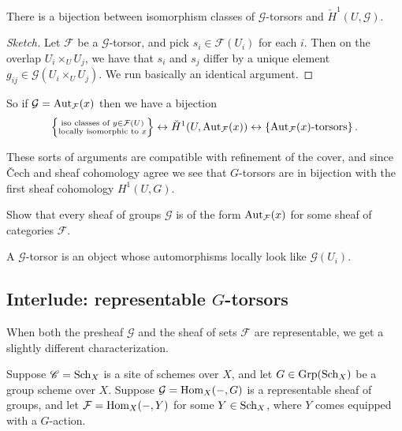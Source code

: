 \documentclass[11pt]{amsart}
\begin{document}
\begin{theorem} There is a bijection between isomorphism classes of $\mathcal{G}$-torsors and $\check{H}^1(U,\mathcal{G})$.
\end{theorem}
\begin{proof}[Sketch] Let $\mathcal{F}$ be a $\mathcal{G}$-torsor, and pick $s_i \in \mathcal{F}(U_i)$ for each $i$. Then on the overlap $U_i \times_U U_j$, we have that $s_i$ and $s_j$ differ by a unique element $g_{ij}\in \mathcal{G}(U_i \times_U U_j)$. We run basically an identical argument.
\end{proof}

So if $\mathcal{G} = \mathrm{Aut}_{\mathcal{F}}(x)$ then we have a bijection
\begin{align*}
    \left\{ \substack{\text{iso classes of }y\in \mathcal{F}(U) \\ \text{locally isomorphic to }x} \right\} \leftrightarrow \check{H}^1(U,\mathrm{Aut}_{\mathcal{F}}(x)) \leftrightarrow \left\{ \mathrm{Aut}_\mathcal{F}(x)\text{-torsors} \right\}.
\end{align*}

These sorts of arguments are compatible with refinement of the cover, and since \v{C}ech and sheaf cohomology agree we see that $G$-torsors are in bijection with the first sheaf cohomology $H^1(U,G)$.


%
\begin{exercise}\label{exer:every-sheaf-of-groups-is-aut} 
Show that every sheaf of groups $\mathcal{G}$ is of the form $\mathrm{Aut}_\mathcal{F}(x)$ for some sheaf of categories $\mathcal{F}$.
\end{exercise}

\begin{intuition} A $\mathcal{G}$-torsor is an object whose automorphisms locally look like $\mathcal{G}(U_i)$.
\end{intuition}

\subsection{Interlude: representable $G$-torsors}

When both the presheaf $\mathcal{G}$ and the sheaf of sets $\mathcal{F}$ are representable, we get a slightly different characterization. 

\begin{setup}\label{set:representable-torsor-and-group-scheme} Suppose $\mathscr{C} = \mathrm{Sch}_X$ is a site of schemes over $X$, and let $G \in \mathrm{Grp}(\mathrm{Sch}_X)$ be a group scheme over $X$. Suppose $\mathcal{G} = \mathrm{Hom}_X(-,G)$ is a representable sheaf of groups, and let $\mathcal{F} = \mathrm{Hom}_X(-,Y)$ for some $Y\in \mathrm{Sch}_X$, where $Y$ comes equipped with a $G$-action.
\end{setup}
\end{document}
